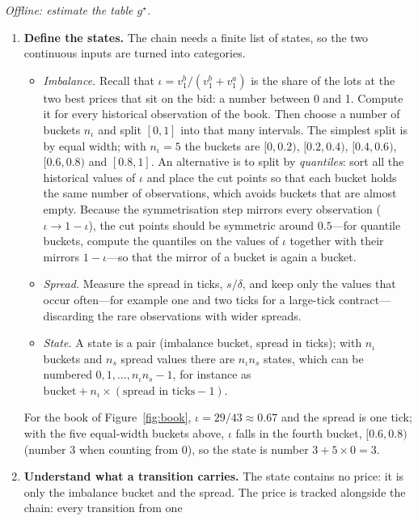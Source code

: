 \emph{Offline: estimate the table $g^{\star}$.}
\begin{enumerate}[leftmargin=1.8em,itemsep=2pt]
\item \textbf{Define the states.} The chain needs a finite list of states, so the two continuous
  inputs are turned into categories.
  \begin{itemize}[leftmargin=1.2em,itemsep=1pt]
  \item \emph{Imbalance.} Recall that $\iota = v^b_1/(v^b_1 + v^a_1)$ is the share of the lots at the
    two best prices that sit on the bid: a number between 0 and 1. Compute it for every historical
    observation of the book. Then choose a number of buckets $n_\iota$ and split $[0, 1]$ into that
    many intervals. The simplest split is by equal width; with $n_\iota = 5$ the buckets are $[0, 0.2)$,
    $[0.2, 0.4)$, $[0.4, 0.6)$, $[0.6, 0.8)$ and $[0.8, 1]$. An alternative is to split by
    \emph{quantiles}: sort all the historical values of $\iota$ and place the cut points so that
    each bucket holds the same number of observations, which avoids buckets that are almost empty.
    Because the symmetrisation step mirrors
    every observation ($\iota \to 1 - \iota$), the cut points should be symmetric around $0.5$---for
    quantile buckets, compute the quantiles on the values of $\iota$ together with their mirrors
    $1 - \iota$---so that the mirror of a bucket is again a bucket.
  \item \emph{Spread.} Measure the spread in ticks, $s/\delta$, and keep only the values that occur
    often---for example one and two ticks for a large-tick contract---discarding the rare
    observations with wider spreads.
  \item \emph{State.} A state is a pair (imbalance bucket, spread in ticks); with $n_\iota$ buckets
    and $n_s$ spread values there are $n_\iota n_s$ states, which can be numbered $0, 1, \dots,
    n_\iota n_s - 1$, for instance as $\text{bucket} + n_\iota \times (\text{spread in ticks} - 1)$.
  \end{itemize}
  For the book of Figure~\ref{fig:book}, $\iota = 29/43 \approx 0.67$ and the spread is one tick; with
  the five equal-width buckets above, $\iota$ falls in the fourth bucket, $[0.6, 0.8)$ (number 3 when
  counting from 0), so the state is number $3 + 5 \times 0 = 3$.
\item \textbf{Understand what a transition carries.} The state contains no price: it is only the
  imbalance bucket and the spread. The price is tracked alongside the chain: every transition from one

\end{enumerate}
